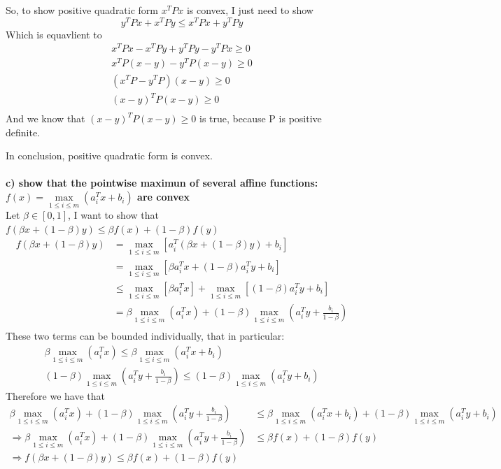 \documentclass[paper=a4, fontsize=11pt]{scrartcl} %
\numberwithin{equation}{section} %
\numberwithin{figure}{section} %
\numberwithin{table}{section} %
\begin{document}
So, to show positive quadratic form $x^TPx$ is convex, I just need to show 
$$
y^T P x + x^T P y \leq x^T P x + y^TP y
$$
Which is equavlient to 
\begin{align*}
x^T P x -  x^T P y  + y^TP y - y^T P x \geq 0	\\
x^T P (x -  y)  - y^TP (x-y) \geq 0	\\
(x^T P - y^TP )(x-y) \geq 0	\\
(x - y )^T P(x-y) \geq 0	\\
\end{align*}
And we know that $(x - y )^T P(x-y) \geq 0$ is true, because P is positive definite. 

In conclusion, positive quadratic form is convex. \\\\

\newpage
\textbf{c) show that the pointwise maximun of several affine functions: $f(x) = \underset{1 \leq i \leq m}{\max} (a_i^T x + b_i)$ are convex}\\

Let $\beta \in [0,1]$, I want to show that $f(\beta x + (1-\beta)y) \leq \beta f(x) + (1-\beta) f(y)$
\begin{align*}
f(\beta x + (1-\beta)y) &= \underset{1 \leq i \leq m}{\max} [a_i^T (\beta x + (1-\beta)y) + b_i]	\\
&= \underset{1 \leq i \leq m}{\max} [\beta a_i^T  x + (1-\beta)a_i^Ty + b_i] \\
&\leq \underset{1 \leq i \leq m}{\max} [\beta a_i^T x] + \underset{1 \leq i \leq m}{\max} [(1-\beta)a_i^Ty + b_i] \\
&= \beta \underset{1 \leq i \leq m}{\max} (a_i^T x) + (1-\beta) \underset{1 \leq i \leq m}{\max} (a_i^Ty + \frac{b_i}{1-\beta} ) \\
\end{align*}
These two terms can be bounded individually, that in particular:  
\begin{align*}
\beta \underset{1 \leq i \leq m}{\max} (a_i^T x) \leq \beta \underset{1 \leq i \leq m}{\max} (a_i^T x + b_i) \\
(1-\beta) \underset{1 \leq i \leq m}{\max} (a_i^Ty + \frac{b_i}{1-\beta} ) \leq (1-\beta) \underset{1 \leq i \leq m}{\max} (a_i^T y + b_i)
\end{align*}
Therefore we have that 
\begin{align*}
\beta \underset{1 \leq i \leq m}{\max} (a_i^T x) + (1-\beta) \underset{1 \leq i \leq m}{\max} (a_i^Ty + \frac{b_i}{1-\beta} ) &\leq \beta \underset{1 \leq i \leq m}{\max} (a_i^T x + b_i) + (1-\beta) \underset{1 \leq i \leq m}{\max} (a_i^T y + b_i)	\\
\Rightarrow \beta \underset{1 \leq i \leq m}{\max} (a_i^T x) + (1-\beta) \underset{1 \leq i \leq m}{\max} (a_i^Ty + \frac{b_i}{1-\beta} ) &\leq \beta f(x) + (1-\beta) f(y) \\
\Rightarrow f(\beta x + (1-\beta)y) \leq \beta f(x) + (1-\beta) f(y)
\end{align*}
\end{document}
